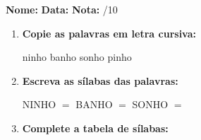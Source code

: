 \begin{exercicio}



\noindent\textbf{Nome:} \underline{\hspace{3.2cm}} \quad \textbf{Data:} \underline{\hspace{1.6cm}} \quad \textbf{Nota:} \underline{\hspace{0.9cm}}/10


\begin{enumerate}

  \item \textbf{Copie as palavras em letra cursiva:}
  \begin{center}
  ninho \quad banho \quad sonho \quad pinho
  \end{center}
  \begin{center}
  \underline{\hspace{2.4cm}} \quad \underline{\hspace{2.4cm}} \quad \underline{\hspace{2.4cm}} \quad \underline{\hspace{2.4cm}}
  \end{center}

  \item \textbf{Escreva as sílabas das palavras:}
  \begin{center}
  NINHO $=$ \underline{\hspace{1.5cm}} \underline{\hspace{1.5cm}} \quad BANHO $=$ \underline{\hspace{1.5cm}} \underline{\hspace{1.5cm}} \quad SONHO $=$ \underline{\hspace{1.5cm}} \underline{\hspace{1.5cm}}
  \end{center}

  \item \textbf{Complete a tabela de sílabas:}

\begin{center}
\end{center}


\end{enumerate}
\end{exercicio}
